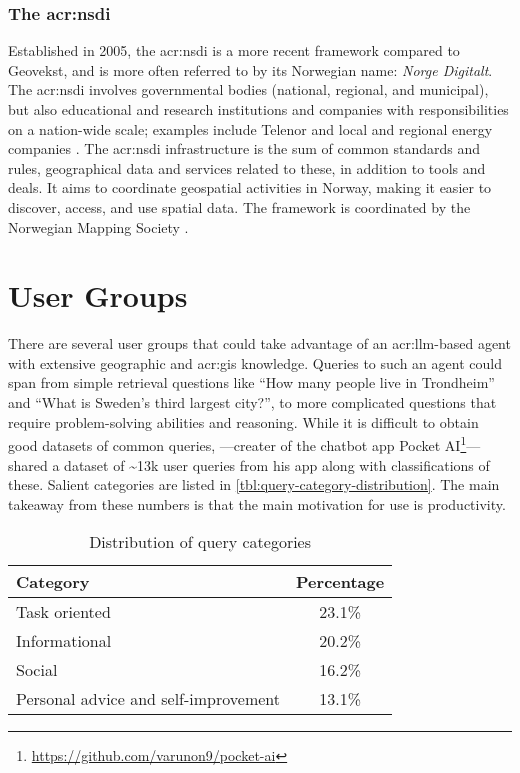 \subsubsection[The National Spatial Data Infrastructure]{The \acrlong{acr:nsdi}}\label{subsubsec:norge-digitalt}

Established in 2005, the \gls{acr:nsdi} is a more recent framework compared to Geovekst, and is more often referred to by its Norwegian name: \textit{Norge Digitalt}. The \gls{acr:nsdi} involves governmental bodies (national, regional, and municipal), but also educational and research institutions and companies with responsibilities on a nation-wide scale; examples include Telenor and local and regional energy companies \citep[6]{norgedigitaltGenerelleVilkarNorge2023}. The \gls{acr:nsdi} infrastructure is the sum of common standards and rules, geographical data and services related to these, in addition to tools and deals. It aims to coordinate geospatial activities in Norway, making it easier to discover, access, and use spatial data. The framework is coordinated by the Norwegian Mapping Society \citep{norgedigitaltGenerelleVilkarNorge2023}.



\section{User Groups}\label{sec:user-groups}

There are several user groups that could take advantage of an \acrshort{acr:llm}-based agent with extensive geographic and \acrshort{acr:gis} knowledge. Queries to such an agent could span from simple retrieval questions like \enquote{How many people live in Trondheim} and \enquote{What is Sweden's third largest city?}, to more complicated questions that require problem-solving abilities and reasoning. While it is difficult to obtain good datasets of common queries, \cite{kumarWhatArePeople2023a}---creater of the chatbot app Pocket AI\footnote{\url{https://github.com/varunon9/pocket-ai}}---shared a dataset of \textasciitilde 13k user queries from his app along with classifications of these. Salient categories are listed in \autoref{tbl:query-category-distribution}. The main takeaway from these numbers is that the main motivation for use is productivity.

\begin{table}[ht]
    \centering
    \begin{tabular}{l|c}
        \toprule
        \textbf{Category}                    & \textbf{Percentage} \\
        \midrule
        Task oriented                        & 23.1\%              \\
        Informational                        & 20.2\%              \\
        Social                               & 16.2\%              \\
        Personal advice and self-improvement & 13.1\%              \\
        \bottomrule
    \end{tabular}
    \caption{Distribution of query categories}
    \label{tbl:query-category-distribution}
\end{table}


